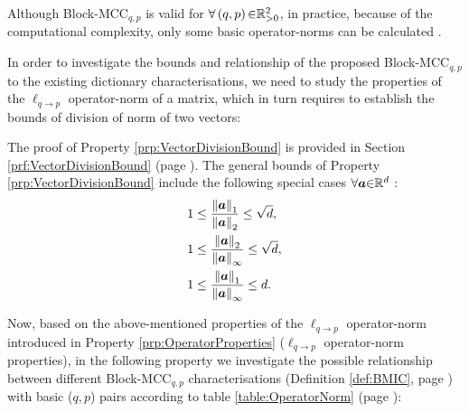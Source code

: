 Although Block-MCC$_{q,p}$ is valid for $\forall \left( q , p \right) {\in} \mathbb{R}^2_{>0}$, in practice, because of the computational complexity, only some basic operator-norms can be calculated \cite{Tropp2004b}.


In order to investigate the bounds and relationship of the proposed Block-MCC$_{q,p}$ to the existing dictionary characterisations, we need to study the properties of the $\ell_{q {\to} p}$ operator-norm of a matrix, which in turn requires to establish the bounds of division of norm of two vectors:

The proof of Property \ref{prp:VectorDivisionBound} is provided in Section \ref{prf:VectorDivisionBound} (page \pageref{prf:VectorDivisionBound}).
The general bounds of Property \ref{prp:VectorDivisionBound} include the following special cases $\forall \boldsymbol{a} {\in} \mathbb{R}^d$ \cite{Golub2013}:
\begin{gather*}
\begin{aligned}
1 &\leq \frac{\left\lVert\boldsymbol{a}\right\rVert_1}{\left\lVert\boldsymbol{a}\right\rVert_2} \leq \sqrt{d}, \\
1 &\leq \frac{\left\lVert\boldsymbol{a}\right\rVert_2}{\left\lVert\boldsymbol{a}\right\rVert_{\infty}} \leq \sqrt{d}, \\
1 &\leq \frac{\left\lVert\boldsymbol{a}\right\rVert_1}{\left\lVert\boldsymbol{a}\right\rVert_{\infty}} \leq d.
\end{aligned}
\end{gather*}



Now, based on the above-mentioned properties of the $\ell_{q {\to} p}$ operator-norm introduced in Property \ref{prp:OperatorProperties} ($\ell_{q {\to} p}$ operator-norm properties), in the following property we investigate the possible relationship between different Block-MCC$_{q,p}$ characterisations (Definition \ref{def:BMIC}, page \pageref{def:BMIC}) with basic ($q,p$) pairs according to table \ref{table:OperatorNorm} (page \pageref{table:OperatorNorm}):


